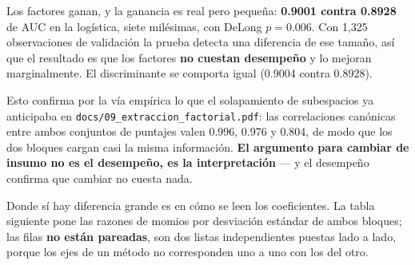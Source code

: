 \documentclass[
  spanish,
  letterpaper,
  DIV=11,
  numbers=noendperiod]{scrartcl}
\newenvironment{Shaded}{\begin{snugshade}}{\end{snugshade}}
\newcommand{\AttributeTok}[1]{\textcolor[rgb]{0.40,0.45,0.13}{#1}}
\newcommand{\CommentTok}[1]{\textcolor[rgb]{0.37,0.37,0.37}{#1}}
\newcommand{\FunctionTok}[1]{\textcolor[rgb]{0.28,0.35,0.67}{#1}}
\newcommand{\NormalTok}[1]{\textcolor[rgb]{0.00,0.23,0.31}{#1}}
\newcommand{\SpecialCharTok}[1]{\textcolor[rgb]{0.37,0.37,0.37}{#1}}
\newcommand{\StringTok}[1]{\textcolor[rgb]{0.13,0.47,0.30}{#1}}
\begin{document}
\begin{Shaded}
\end{Shaded}

Los factores ganan, y la ganancia es real pero pequeña: \textbf{0.9001
contra 0.8928} de AUC en la logística, siete milésimas, con DeLong
\(p = 0.006\). Con 1,325 observaciones de validación la prueba detecta
una diferencia de ese tamaño, así que el resultado es que los factores
\textbf{no cuestan desempeño} y lo mejoran marginalmente. El
discriminante se comporta igual (0.9004 contra 0.8928).

Esto confirma por la vía empírica lo que el solapamiento de subespacios
ya anticipaba en \texttt{docs/09\_extraccion\_factorial.pdf}: las
correlaciones canónicas entre ambos conjuntos de puntajes valen 0.996,
0.976 y 0.804, de modo que los dos bloques cargan casi la misma
información. \textbf{El argumento para cambiar de insumo no es el
desempeño, es la interpretación} --- y el desempeño confirma que cambiar
no cuesta nada.

Donde sí hay diferencia grande es en cómo se leen los coeficientes. La
tabla siguiente pone las razones de momios por desviación estándar de
ambos bloques; las filas \textbf{no están pareadas}, son dos listas
independientes puestas lado a lado, porque los ejes de un método no
corresponden uno a uno con los del otro.
\end{document}
